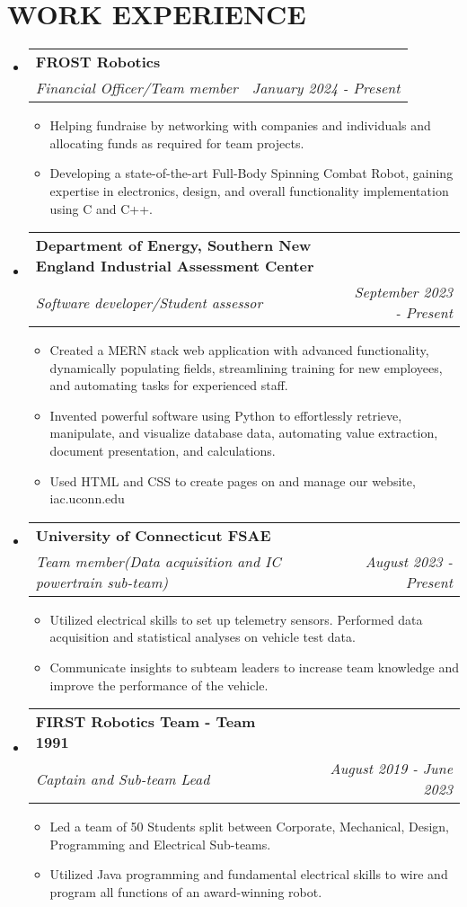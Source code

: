 \documentclass[letterpaper,11pt]{article}
\makeatletter
\newcommand{\resumeItem}[1]{
  \item\small{
    {#1 \vspace{-1pt}}
  }
}
\newcommand{\resumeSubheading}[4]{
  \vspace{-2pt}\item
    \begin{tabular*}{1.0\textwidth}[t]{l@{\extracolsep{\fill}}r}
      \textbf{\large#1} & \textbf{\small #2} \\
      \textit{\large#3} & \textit{\small #4} \\
      
    \end{tabular*}\vspace{-7pt}
}
\newcommand{\resumeSubHeadingListStart}{\begin{itemize}[leftmargin=0.0in, label={}]}
\newcommand{\resumeSubHeadingListEnd}{\end{itemize}}
\newcommand{\resumeItemListStart}{\begin{itemize}[leftmargin=0.1in]}
\newcommand{\resumeItemListEnd}{\end{itemize}\vspace{-5pt}}
\makeatother
\begin{document}
\section{\color{airforceblue}WORK EXPERIENCE}
  \resumeSubHeadingListStart
 
 \resumeSubheading
      {FROST Robotics}{} 
      {Financial Officer/Team member}{January 2024 - Present}
      \resumeItemListStart
            \resumeItem{\normalsize{Helping fundraise by networking with companies and individuals and allocating funds as required for team projects.}}  
            \resumeItem{\normalsize{Developing a state-of-the-art Full-Body Spinning Combat Robot, gaining expertise in electronics, design, and overall functionality implementation using C and C++.}}
      \resumeItemListEnd 
      
    \resumeSubheading
      {Department of Energy, Southern New England Industrial Assessment Center}{} 
      {Software developer/Student assessor}{September 2023 - Present}
      \resumeItemListStart
            \resumeItem{\normalsize{Created a MERN stack web application with advanced functionality, dynamically populating fields, streamlining training for new employees, and automating tasks for experienced staff.}}  
            \resumeItem{\normalsize{Invented powerful software using Python to effortlessly retrieve, manipulate, and visualize database data, automating value extraction, document presentation, and calculations.}} 
            \resumeItem{\normalsize{Used HTML and CSS to create pages on and manage our website, iac.uconn.edu}}
      \resumeItemListEnd  

    \resumeSubheading
      {University of Connecticut FSAE}{} 
      {Team member(Data acquisition and IC powertrain sub-team)}{August 2023 - Present}
      \resumeItemListStart
             \resumeItem{\normalsize{Utilized electrical skills to set up telemetry sensors. Performed data acquisition and statistical analyses on vehicle test data.
            }}
             \resumeItem{\normalsize{Communicate insights to subteam leaders to increase team knowledge and improve the performance of the vehicle.}}
           
      \resumeItemListEnd  
      
   \resumeSubheading
      {FIRST Robotics Team - Team 1991}{} 
      {Captain and Sub-team Lead}{August 2019 - June 2023}
      \resumeItemListStart
            \resumeItem{\normalsize{Led a team of 50 Students split between Corporate, Mechanical, Design, Programming and Electrical Sub-teams.}}
            \resumeItem{\normalsize{Utilized Java programming and fundamental electrical skills to wire and program all functions of an award-winning robot.}} 
      \resumeItemListEnd  
        \resumeSubHeadingListEnd
    
\end{document}
